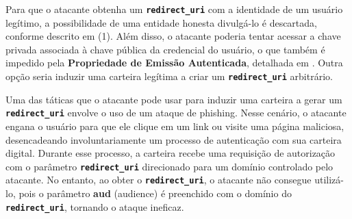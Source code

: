 

Para que o atacante obtenha um \textbf{\texttt{redirect\_uri}} com a identidade de um usuário legítimo, a possibilidade de uma entidade honesta divulgá-lo é descartada, conforme descrito em (1). Além disso, o atacante poderia tentar acessar a chave privada associada à chave pública da credencial do usuário, o que também é impedido pela \textbf{Propriedade de Emissão Autenticada}, detalhada em \cite{hauck2023openid}. Outra opção seria induzir uma carteira legítima a criar um \textbf{\texttt{redirect\_uri}} arbitrário.

Uma das táticas que o atacante pode usar para induzir uma carteira a gerar um \textbf{\texttt{redirect\_uri}} envolve o uso de um ataque de phishing. Nesse cenário, o atacante engana o usuário para que ele clique em um link ou visite uma página maliciosa, desencadeando involuntariamente um processo de autenticação com sua carteira digital. Durante esse processo, a carteira recebe uma requisição de autorização com o parâmetro \textbf{\texttt{redirect\_uri}} direcionado para um domínio controlado pelo atacante. No entanto, ao obter o \textbf{\texttt{redirect\_uri}}, o atacante não consegue utilizá-lo, pois o parâmetro \textbf{aud} (audience) é preenchido com o domínio do \textbf{\texttt{redirect\_uri}}, tornando o ataque ineficaz.



